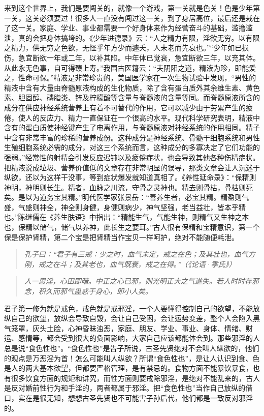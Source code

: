 来到这个世界上，我们是要闯关的，就像一个游戏，第一关就是色关！色是少年第一关，这关必须要过！很多人一直没有闯过这一关，到了身居高位，最后还是栽在了这一关。家庭、学业、事业都需要一个好身体来作为经营奋斗的基础，滥撸滥泄，真的会把身体搞垮的。《少年进德录》云：“人之精力有限，淫欲无穷。以有限之精力，供无穷之色欲，无怪乎年方少而遽夭，人未老而先衰也。”“少年如已损伤，急宜断欲一年或二年，以补其陷。中年体已觉衰，急宜断欲三年，以充其体。从此永无色事，自可得臻上寿。”我国古医籍云：“夫阴阳之道，精液为珍，即能爱之，性命可保。”精液是非常珍贵的，美国医学家在一次生物试验中发现，“男性的精液中含有大量由脊髓原液构成的生化物质，除了含有蛋白质外其余维生素、黄色素、胆固醇、磷脂类、锌及柠檬酸等含量与脊髓液的含量等同。而脊髓原液所含的成分在供应神经系统营养上有着不可替代的作用，它可以减少由于劳累产生的疲倦，使人的反应力、精力一直保证在一个很高的水平。现代科学研究表明，精液中含有的蛋白质使神经键产生了电离作用，与脊髓原液对神经系统的作用相同。精子中含有非常丰富的珍稀的营养成份。这种成分是神经系统、骨髓干细胞系统和男性生殖细胞系统必需的成分，对这三个系统而言，这种成分的多寡决定了它们功能的强弱。”经常性的射精会引发反应迟钝以及疲倦症状，也会导致其他各种伤精症状。把精液说成垃圾、营养价值低的文章存在非常明显的误导，那类文章会让人沉迷于纵欲，还以为这样干没事，等到症状爆发就知道真相了。《养性延命录》：“保精则神明，神明则长生。精者，血脉之川流，守骨之灵神也。精去则骨枯，骨枯则死矣。是以为道务宝其精。”明代医学家张景岳：“善养生者，必宝其精。精盈则气盛，气盛则神全，神全则身健，身健则病少，神气坚强，老当益壮，皆本乎精也。”陈继儒在《养生肤语》中指出：“精能生气，气能生神，则精气又生神之本也，保精以储气，储气以养神，此长生之要耳。”古人很有保精和宝精意识，第一个保是保护肾精，第二个宝是把肾精当作宝贝一样呵护，绝对不能随便耗泄。

\begin{quote}\it
    孔子曰：“君子有三戒：少之时，血气未定，戒之在色；及其壮也，血气方刚，戒之在斗；及其老也，血气既衰，戒之在得。”（《论语·季氏》）
\end{quote}

\begin{quote}\it
    人一思淫，心田即暗。中正之心已邪，则光明正大之气遂失。若人时时存邪念，积久而邪气蛊惑于身心，即小人矣。
\end{quote}

君子第一修为就是戒色，戒色就是戒邪淫，一个人要懂得控制自己的欲望，不能放纵自己的欲望，放纵会导致自毁，会让自己受困，会让运势变差，整个人会陷入黑气笼罩，灰头土脸，心神昏昧浊恶，家庭、朋友、学业、事业、身体、情绪、财运、感情等，都会受到很大的负面影响，大家自己应该都能体会到。那些邪淫的人总是说“食色性也”。“食色性也”是告子所说，古圣先贤绝对不会叫人纵欲的，他们的观点是万恶淫为首！怎么可能叫人纵欲？所谓“食色性也”，是让人认识到食、色是人的两大基本欲望，但都要严格管理，是有禁忌的。食物方面不能暴饮暴食，也有很多饮食方面的规矩和讲究，而性方面则要戒除邪淫，是绝对不能乱来的，古人是反对婚前性行为和手淫的，两者都属于邪淫。把“食色性也”当作自己放纵的借口，实在是很无知，想想古圣先贤也不可能害子孙后代，他们都是一致反对邪淫的。


